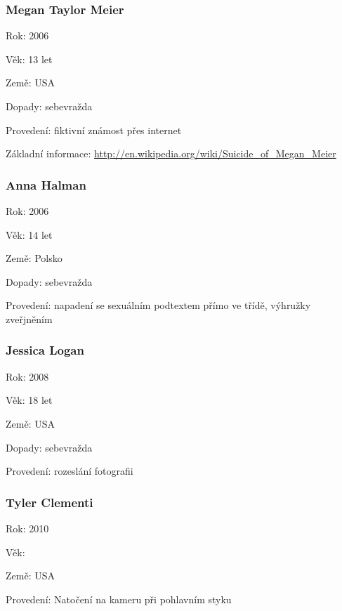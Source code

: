 \documentclass[xetex]{beamer}
\begin{document}
\begin{frame}
	\frametitle{Megan Taylor Meier}

	Rok: 2006

	Věk: 13 let

	Země: USA

	Dopady: sebevražda
	
	Provedení: fiktivní známost přes internet

	Základní informace: \url{http://en.wikipedia.org/wiki/Suicide\_of\_Megan\_Meier}
\end{frame}

\begin{frame}
  \frametitle{Anna Halman}

  Rok: 2006

	Věk: 14 let

	Země: Polsko

	Dopady: sebevražda

	Provedení: napadení se sexuálním podtextem přímo ve třídě, výhružky zveřjněním
\end{frame}


\begin{frame}
	\frametitle{Jessica Logan}

	Rok: 2008

	Věk: 18 let

	Země: USA

	Dopady: sebevražda

	Provedení: rozeslání fotografii
\end{frame}

\begin{frame}
	\frametitle{Tyler Clementi}
	Rok: 2010

	Věk:

	Země: USA

	Provedení: Natočení na kameru při pohlavním styku
\end{frame}

%
%
\end{document}
